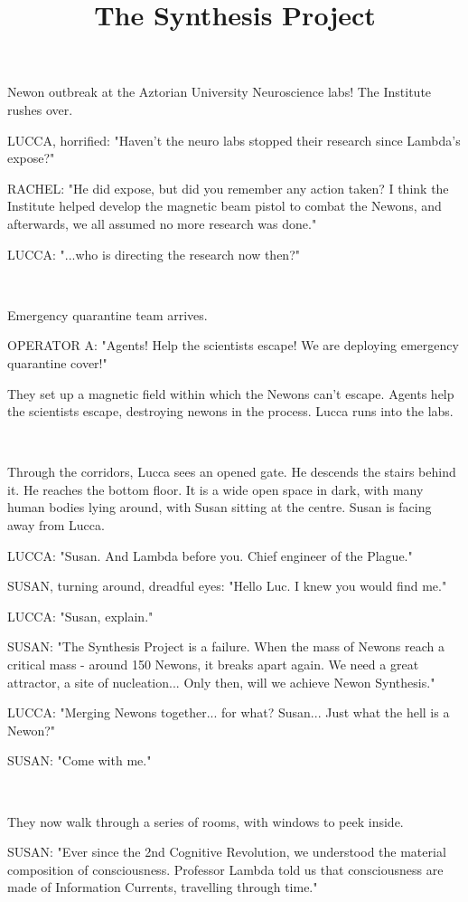 \documentclass[11pt]{article}
\begin{document}
\ttfamily
\title{The Synthesis Project}
\maketitle

Newon outbreak at the Aztorian University Neuroscience labs!
The Institute rushes over.

LUCCA, horrified: "Haven't the neuro labs stopped their research since Lambda's expose?"

RACHEL: "He did expose, but did you remember any action taken?
I think the Institute helped develop the magnetic beam pistol to combat the Newons, and afterwards, we all assumed no more research was done."

LUCCA: "...who is directing the research now then?"

\ 

Emergency quarantine team arrives.

OPERATOR A: "Agents! Help the scientists escape!
We are deploying emergency quarantine cover!"

They set up a magnetic field within which the Newons can't escape.
Agents help the scientists escape, destroying newons in the process.
Lucca runs into the labs.

\ 

Through the corridors, Lucca sees an opened gate.
He descends the stairs behind it.
He reaches the bottom floor. 
It is a wide open space in dark, with many human bodies lying around, with Susan sitting at the centre.
Susan is facing away from Lucca.

LUCCA: "Susan. And Lambda before you.
Chief engineer of the Plague."

SUSAN, turning around, dreadful eyes: "Hello Luc.
I knew you would find me."

LUCCA: "Susan, explain."

SUSAN: "The Synthesis Project is a failure. 
When the mass of Newons reach a critical mass - around 150 Newons, it breaks apart again.
We need a great attractor, a site of nucleation...
Only then, will we achieve Newon Synthesis."

LUCCA: "Merging Newons together... for what?
Susan... Just what the hell is a Newon?"

SUSAN: "Come with me."

\ 

They now walk through a series of rooms, with windows to peek inside.

SUSAN: "Ever since the 2nd Cognitive Revolution, we understood the material composition of consciousness.
Professor Lambda told us that consciousness are made of Information Currents, travelling through time."
\end{document}
